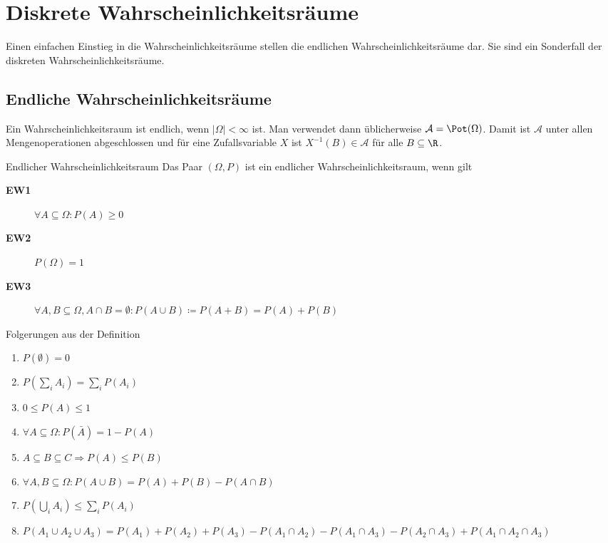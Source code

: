 \chapter{Diskrete Wahrscheinlichkeitsräume}
Einen einfachen Einstieg in die Wahrscheinlichkeitsräume stellen die endlichen Wahrscheinlichkeitsräume dar. Sie sind ein Sonderfall der diskreten Wahrscheinlichkeitsräume.
\section{Endliche Wahrscheinlichkeitsräume}
Ein Wahrscheinlichkeitsraum ist endlich, wenn $|\Omega|<\infty$ ist. Man verwendet dann üblicherweise $\mathcal A=\Pot(\Omega)$. Damit ist $\mathcal A$ unter allen Mengenoperationen abgeschlossen und für eine Zufallsvariable $X$ ist $X^{-1}(B)\in\mathcal A$ für alle $B\subseteq\R$.

\begin{definition}{Endlicher Wahrscheinlichkeitsraum}
	Das Paar $(\Omega, P)$ ist ein endlicher Wahrscheinlichkeitsraum, wenn gilt
	\begin{description}
		\item[\bf EW1] $\forall A\subseteq \Omega: P(A)\geq 0$
		\item[\bf EW2] $P(\Omega)=1$
		\item[\bf EW3] $\forall A,B\subseteq \Omega, A\cap B=\emptyset: P(A\cup B)\coloneqq P(A+B)=P(A)+P(B) $
	\end{description}
\end{definition}

\begin{satz}{Folgerungen aus der Definition}
	\begin{enumerate}
		\item $P(\emptyset)=0$
		\item $P\left(\sum_i A_i\right)=\sum_i P(A_i)$
		\item $0\leq P(A)\leq 1$
		\item $\forall A\subseteq\Omega: P(\bar A)=1-P(A)$
		\item $A\subseteq B\subseteq C\Rightarrow P(A)\leq P(B)$
		\item $\forall A,B\subseteq \Omega: P(A\cup B)=P(A)+P(B)-P(A\cap B)$
		\item $P\left(\bigcup_i A_i\right)\leq \sum_i P(A_i)$
		\item $P(A_1\cup A_2\cup A_3)=P(A_1)+P(A_2)+P(A_3)-P(A_1\cap A_2)-P(A_1\cap A_3)-P(A_2\cap A_3)+P(A_1\cap A_2\cap A_3)$
	\end{enumerate}
\end{satz}

